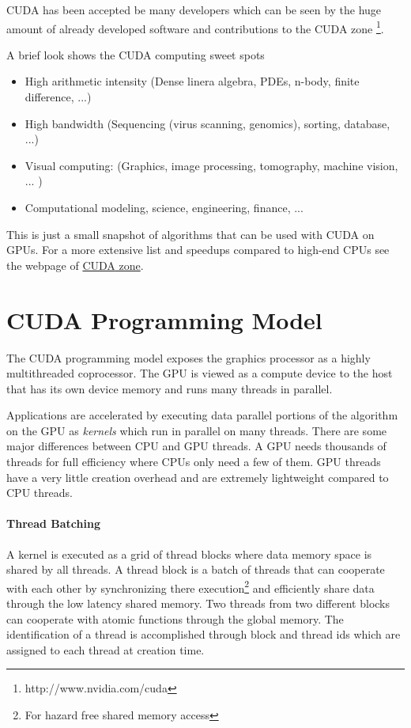 \Gls{CUDA} has been accepted be many developers which can be seen by the huge
amount of already developed software and contributions to the \gls{CUDA}
zone \footnote{http://www.nvidia.com/cuda}.

A brief look shows the \gls{CUDA} computing sweet 
spots\citep{citeulike:3839013}

\begin{itemize}
	\item High arithmetic intensity (Dense linera algebra, PDEs, n-body, 
			finite difference, ...) 
	\item High bandwidth (Sequencing (virus scanning, genomics), sorting, 			
			database, ...) 
	\item Visual computing: (Graphics, image processing, tomography, 
			machine vision, ... ) 
	\item Computational modeling, science, engineering, finance, ... 			
\end{itemize} 

This is just a small snapshot of algorithms that can be used with \gls{CUDA} on
\glspl{GPU}. For a more extensive list and speedups compared to high-end
\glspl{CPU} see the webpage of {}
\href{http://www.nvidia.com/cuda}{\gls{CUDA} zone}. 

\section{CUDA Programming Model}%
\label{sub:cuda_programming_model} 
The \gls{CUDA} programming model exposes the graphics processor as a highly
multithreaded coprocessor. The \gls{GPU} is viewed as a compute device to the
host that has its own device memory and runs many threads in parallel.

Applications are accelerated by executing data parallel portions of the
algorithm on the \gls{GPU} as \emph{kernels} which run in parallel on many
threads. There are some major differences between \gls{CPU} and
\gls{GPU} threads. A \gls{GPU} needs thousands of threads for full efficiency
where \glspl{CPU} only need a few of them. \Gls{GPU} threads have a very little
creation overhead and are extremely lightweight compared to \gls{CPU} threads.

\paragraph{Thread Batching}%
\label{par:thread_batching} 
A kernel is executed as a grid of thread blocks where data memory space is
shared by all threads. A thread block is a batch of threads that can cooperate
with each other by synchronizing there execution\footnote{For hazard free shared
memory access} and efficiently share data through the low latency shared
memory. Two threads from two different blocks can cooperate with atomic 
functions through the global memory. The identification of a thread is 
accomplished through block and thread ids which are assigned to each thread at 
creation time. 


